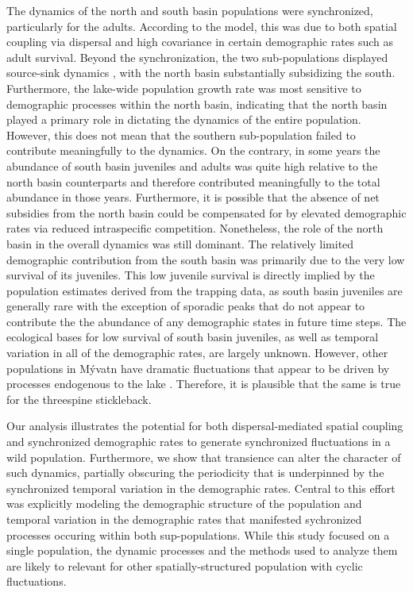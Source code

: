 \documentclass[11pt]{article}
\begin{document}
{The dynamics of the north and south basin populations were synchronized,
particularly for the adults. 
According to the model, 
this was due to both spatial coupling via dispersal 
and high covariance in certain demographic rates such as adult survival.
Beyond the synchronization, 
the two sub-populations displayed source-sink dynamics \citep{pulliam1988},
with the north basin substantially subsidizing the south.
Furthermore,
the lake-wide population growth rate was most sensitive to demographic processes 
within the north basin,
indicating that the north basin played a primary role in dictating the dynamics 
of the entire population.
However, this does not mean that the southern sub-population failed to contribute 
meaningfully to the dynamics.
On the contrary,
in some years the abundance of south basin juveniles and adults was quite high relative
to the north basin counterparts 
and therefore contributed meaningfully to the total abundance in those years.
Furthermore, it is possible that the absence of net subsidies from the north basin
could be compensated for by elevated demographic rates via reduced intraspecific competition.
Nonetheless, the role of the north basin in the overall dynamics was still dominant.
The relatively limited demographic contribution from the south basin was primarily due
to the very low survival of its juveniles. 
This low juvenile survival is directly implied by the population estimates derived 
from the trapping data,
as south basin juveniles are generally rare with the exception of sporadic peaks that
do not appear to contribute the the abundance of any demographic states in future time steps.
The ecological bases for low survival of south basin juveniles,
as well as temporal variation in all of the demographic rates,
are largely unknown.
However, other populations in M\'{y}vatn have dramatic fluctuations that appear to be 
driven by processes endogenous to the lake
\citep{einarsson2002, ives2008, einarsson2016}. 
Therefore, it is plausible that the same is true for the threespine stickleback.

Our analysis illustrates the potential for both dispersal-mediated spatial coupling 
and synchronized demographic rates to generate synchronized fluctuations in a wild population.
Furthermore, we show that transience can alter the character of such dynamics,
partially obscuring the periodicity that is underpinned by the synchronized temporal
variation in the demographic rates.
Central to this effort was explicitly modeling the demographic structure of the population
and temporal variation in the demographic rates 
that manifested sychronized processes occuring within both sup-populations.
While this study focused on a single population,
the dynamic processes and the methods used to analyze them are likely to relevant for 
other spatially-structured population with cyclic fluctuations.




}
\end{document}
